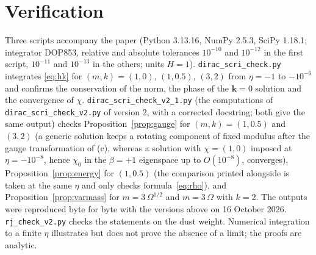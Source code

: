 \documentclass[11pt,a4paper]{article}
\theoremstyle{definition}
\begin{document}
\section*{Verification}
Three scripts accompany the paper (Python 3.13.16, NumPy 2.5.3, SciPy 1.18.1; integrator DOP853, relative and absolute tolerances $10^{-10}$ and $10^{-12}$ in the first script, $10^{-11}$ and $10^{-13}$ in the others; units $H=1$). \texttt{dirac\_scri\_check.py} integrates \eqref{eq:hk} for $(m,k)=(1,0)$, $(1,0.5)$, $(3,2)$ from $\eta=-1$ to $-10^{-6}$ and confirms the conservation of the norm, the phase of the $\mathbf{k}=0$ solution and the convergence of $\chi$. \texttt{dirac\_scri\_check\_v2\_1.py} (the computations of \texttt{dirac\_scri\_check\_v2.py} of version 2, with a corrected docstring; both give the same output) checks Proposition~\ref{prop:gauge} for $(m,k)=(1,0.5)$ and $(3,2)$ (a generic solution keeps a rotating component of fixed modulus after the gauge transformation of (c), whereas a solution with $\chi=(1,0)$ imposed at $\eta=-10^{-8}$, hence $\chi_{0}$ in the $\beta=+1$ eigenspace up to $O(10^{-8})$, converges), Proposition~\ref{prop:energy} for $(1,0.5)$ (the comparison printed alongside is taken at the same $\eta$ and only checks formula~\eqref{eq:rho}), and Proposition~\ref{prop:varmass} for $m=3\,\Omega^{1/2}$ and $m=3\,\Omega$ with $k=2$. The outputs were reproduced byte for byte with the versions above on 16 October 2026. \texttt{rj\_check\_v2.py} \cite{Companion} checks the statements on the dust weight. Numerical integration to a finite $\eta$ illustrates but does not prove the absence of a limit; the proofs are analytic.
\end{document}
